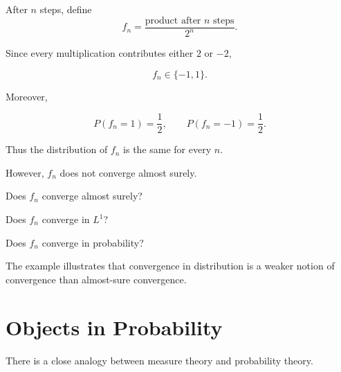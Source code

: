 After $n$ steps, define
\[
f_n
=
\frac{\text{product after $n$ steps}}{2^n}.
\]

Since every multiplication contributes either $2$ or $-2$,

\[
f_n\in\{-1,1\}.
\]

Moreover,

\[
P(f_n=1)=\frac12,
\qquad
P(f_n=-1)=\frac12.
\]

Thus the distribution of $f_n$ is the same for every $n$.

However, $f_n$ does not converge almost surely.

\begin{questions}

    \item Does $f_n$ converge almost surely?

    \item Does $f_n$ converge in $L^1$?

    \item Does $f_n$ converge in probability?

\end{questions}

\begin{remark}

The example illustrates that convergence in distribution is a weaker
notion of convergence than almost-sure convergence.

\end{remark}

\section{Objects in Probability}

There is a close analogy between measure theory and probability theory.

